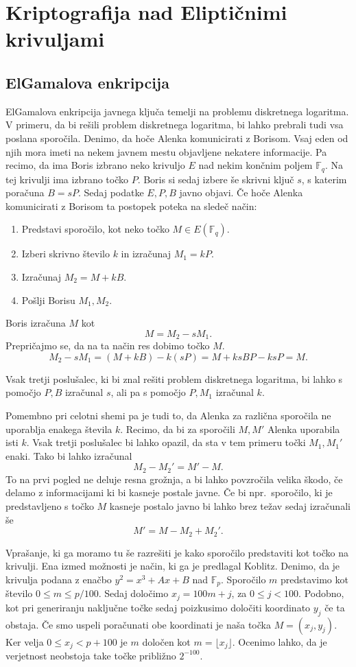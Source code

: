 \documentclass[12pt,a4paper,twoside]{article}
\theoremstyle{definition} %
\theoremstyle{plain} %
\numberwithin{equation}{section}  %
\newcommand{\F}{\mathbb F}
\newcommand{\E}[1]{E({#1})}
\begin{document}
\section{Kriptografija nad Eliptičnimi krivuljami}

\subsection{ElGamalova enkripcija}

ElGamalova enkripcija javnega ključa temelji na problemu diskretnega logaritma. V primeru, da bi rešili problem diskretnega logaritma, bi lahko prebrali tudi vsa poslana sporočila. Denimo, da hoče Alenka komunicirati z Borisom. Vsaj eden od njih mora imeti na nekem javnem mestu objavljene nekatere informacije. Pa recimo, da ima Boris izbrano neko krivuljo $E$ nad nekim končnim poljem $\F_q$. Na tej krivulji ima izbrano točko $P$. Boris si sedaj izbere še skrivni ključ $s$, s katerim poračuna $B=sP$. Sedaj podatke $E,P,B$ javno objavi. Če hoče Alenka komunicirati z Borisom ta postopek poteka na sledeč način:
\begin{enumerate}
\item Predstavi sporočilo, kot neko točko $M\in \E{\F_q}$.
\item Izberi skrivno število $k$ in izračunaj $M_1 = kP$.
\item Izračunaj $M_2 = M+kB$.
\item Pošlji Borisu $M_1,M_2$.
\end{enumerate}

Boris izračuna $M$ kot
$$M = M_2-sM_1.$$
Prepričajmo se, da na ta način res dobimo točko $M$.
$$M_2-sM_1 = (M+kB)-k(sP)=M+ksBP-ksP = M.$$

Vsak tretji poslušalec, ki bi znal rešiti problem diskretnega logaritma, bi lahko s pomočjo $P,B$ izračunal $s$, ali pa s pomočjo $P,M_1$ izračunal $k$.

Pomembno pri celotni shemi pa je tudi to, da Alenka za različna sporočila ne uporablja enakega števila $k$. Recimo, da bi za sporočili $M,M'$ Alenka uporabila isti $k$. Vsak tretji poslušalec bi lahko opazil, da sta v tem primeru točki $M_1,M_1'$ enaki. Tako bi lahko izračunal
$$M_2-M_2' = M'-M.$$
To na prvi pogled ne deluje resna grožnja, a bi lahko povzročila velika škodo, če delamo z informacijami ki bi kasneje postale javne. Če bi npr.\ sporočilo, ki je predstavljeno s točko $M$ kasneje postalo javno bi lahko brez težav sedaj izračunali še
$$M' = M-M_2+M_2'.$$

Vprašanje, ki ga moramo tu še razrešiti je kako sporočilo predstaviti kot točko na krivulji. Ena izmed možnosti je način, ki ga je predlagal Koblitz. Denimo, da je krivulja podana z enačbo
$y^2 = x^3+Ax+B$ nad $\F_p$. Sporočilo $m$ predstavimo kot število $0 \leq m \leq p/100$. Sedaj določimo $x_j = 100m+j$, za $0\leq j < 100$. Podobno, kot pri generiranju naključne točke sedaj poizkusimo določiti koordinato $y_j$ če ta obstaja. Če smo uspeli poračunati obe koordinati je naša točka $M=(x_j,y_j)$. Ker velja $0\leq x_j < p+100$ je $m$ določen kot
$m = \lfloor x_j \rfloor$.
Ocenimo lahko, da je verjetnost neobstoja take točke približno $2^{-100}$.
\end{document}
